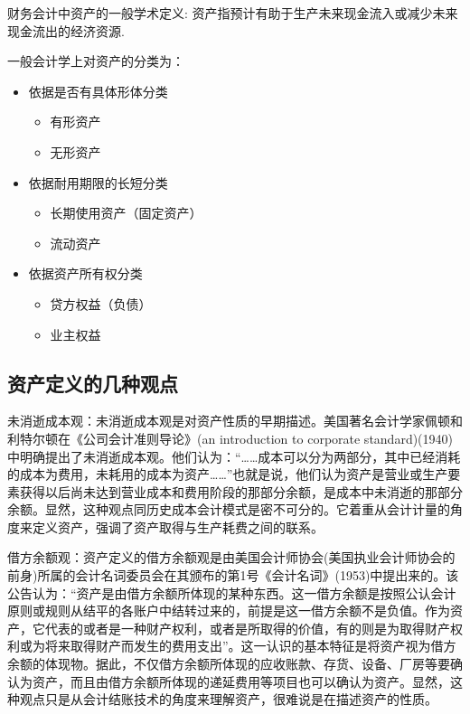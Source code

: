     财务会计中资产的一般学术定义: 资产指预计有助于生产未来现金流入或减少未来现金流出的经济资源.

    一般会计学上对资产的分类为：
    \begin{itemize}
        \item  依据是否有具体形体分类
            \begin{itemize}
                \item  有形资产
                \item  无形资产
            \end{itemize}

        \item  依据耐用期限的长短分类
            \begin{itemize}
                \item  长期使用资产（固定资产）
                \item  流动资产
            \end{itemize}

        \item  依据资产所有权分类
            \begin{itemize}
                \item  贷方权益（负债）
                \item  业主权益
            \end{itemize}
    \end{itemize}

\subsection {资产定义的几种观点}

    未消逝成本观：未消逝成本观是对资产性质的早期描述。美国著名会计学家佩顿和利特尔顿在《公司会计准则导论》(an introduction to corporate standard)(1940)中明确提出了未消逝成本观。他们认为：“……成本可以分为两部分，其中已经消耗的成本为费用，未耗用的成本为资产……”也就是说，他们认为资产是营业或生产要素获得以后尚未达到营业成本和费用阶段的那部分余额，是成本中未消逝的那部分余额。显然，这种观点同历史成本会计模式是密不可分的。它着重从会计计量的角度来定义资产，强调了资产取得与生产耗费之间的联系。

    借方余额观：资产定义的借方余额观是由美国会计师协会(美国执业会计师协会的前身)所属的会计名词委员会在其颁布的第1号《会计名词》(1953)中提出来的。该公告认为：“资产是由借方余额所体现的某种东西。这一借方余额是按照公认会计原则或规则从结平的各账户中结转过来的，前提是这一借方余额不是负值。作为资产，它代表的或者是一种财产权利，或者是所取得的价值，有的则是为取得财产权利或为将来取得财产而发生的费用支出”。这一认识的基本特征是将资产视为借方余额的体现物。据此，不仅借方余额所体现的应收账款、存货、设备、厂房等要确认为资产，而且由借方余额所体现的递延费用等项目也可以确认为资产。显然，这种观点只是从会计结账技术的角度来理解资产，很难说是在描述资产的性质。

